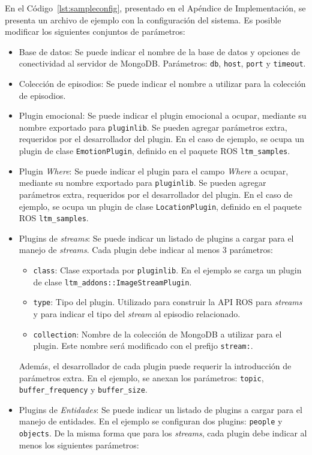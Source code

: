 En el Código~\ref{lst:sampleconfig}, presentado en el Apéndice de Implementación, se presenta un archivo de ejemplo con la configuración del sistema. Es posible modificar los siguientes conjuntos de parámetros:
\begin{itemize}
\item Base de datos: Se puede indicar el nombre de la base de datos y opciones de conectividad al servidor de MongoDB. Parámetros: \texttt{db}, \texttt{host}, \texttt{port} y \texttt{timeout}.
\item Colección de episodios: Se puede indicar el nombre a utilizar para la colección de episodios.
\item Plugin emocional: Se puede indicar el plugin emocional a ocupar, mediante su nombre exportado para \texttt{pluginlib}. Se pueden agregar parámetros extra, requeridos por el desarrollador del plugin. En el caso de ejemplo, se ocupa un plugin de clase \texttt{EmotionPlugin}, definido en el paquete ROS \texttt{ltm\_samples}.
\item Plugin \textit{Where}: Se puede indicar el plugin para el campo \textit{Where} a ocupar, mediante su nombre exportado para \texttt{pluginlib}. Se pueden agregar parámetros extra, requeridos por el desarrollador del plugin. En el caso de ejemplo, se ocupa un plugin de clase \texttt{LocationPlugin}, definido en el paquete ROS \texttt{ltm\_samples}.
\item Plugins de \textit{streams}: Se puede indicar un listado de plugins a cargar para el manejo de \textit{streams}. Cada plugin debe indicar al menos 3 parámetros:
\begin{itemize}
\item \texttt{class}: Clase exportada por \texttt{pluginlib}. En el ejemplo se carga un plugin de clase \texttt{ltm\_addons::ImageStreamPlugin}.
\item \texttt{type}: Tipo del plugin. Utilizado para construir la API ROS para \textit{streams} y para indicar el tipo del \textit{stream} al episodio relacionado.
\item \texttt{collection}: Nombre de la colección de MongoDB a utilizar para el plugin. Este nombre será modificado con el prefijo \texttt{stream:}.
\end{itemize}
Además, el desarrollador de cada plugin puede requerir la introducción de parámetros extra. En el ejemplo, se anexan los parámetros: \texttt{topic}, \texttt{buffer\_frequency} y \texttt{buffer\_size}.
\item Plugins de \textit{Entidades}: Se puede indicar un listado de plugins a cargar para el manejo de entidades. En el ejemplo se configuran dos plugins: \texttt{people} y \texttt{objects}. De la misma forma que para los \textit{streams}, cada plugin debe indicar al menos los siguientes parámetros:

\end{itemize}
